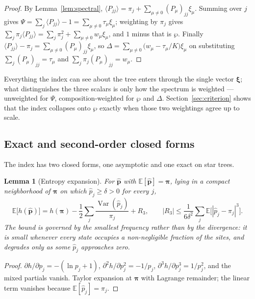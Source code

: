 \documentclass[preprint,12pt,authoryear]{elsarticle}
\newcommand{\bpi}{\boldsymbol{\pi}}
\newcommand{\bxi}{\boldsymbol{\xi}}
\newcommand{\E}{\mathbb{E}}
\newcommand{\Var}{\operatorname{Var}}
\newtheorem{lemma}[theorem]{Lemma}
\theoremstyle{definition}
\theoremstyle{remark}
\begin{document}
\begin{proof}
By Lemma~\ref{lem:spectral},
$\langle P_{jj}\rangle=\pi_j+\sum_{\mu\ne0}(P_\mu)_{jj}\xi_\mu$. Summing over
$j$ gives $\Psi=\sum_j\langle P_{jj}\rangle-1=\sum_{\mu\ne0}\tau_\mu\xi_\mu$;
weighting by $\pi_j$ gives
$\sum_j\pi_j\langle P_{jj}\rangle=\sum_j\pi_j^2+\sum_{\mu\ne0}w_\mu\xi_\mu$,
and $1$ minus that is $\wp$. Finally
$\langle P_{jj}\rangle-\pi_j=\sum_{\mu\ne0}(P_\mu)_{jj}\xi_\mu$, so
$\Delta=\sum_{\mu\ne0}\bigl(w_\mu-\tau_\mu/K\bigr)\xi_\mu$ on substituting
$\sum_j(P_\mu)_{jj}=\tau_\mu$ and $\sum_j\pi_j(P_\mu)_{jj}=w_\mu$.
\end{proof}

Everything the index can see about the tree enters through the single vector
$\bxi$; what distinguishes the three scalars is only how the spectrum is
weighted --- unweighted for $\Psi$, composition-weighted for $\wp$ and
$\Delta$. Section~\ref{sec:criterion} shows that the index collapses onto
$\wp$ exactly when those two weightings agree up to scale.

\subsection{Exact and second-order closed forms}

The index has two closed forms, one asymptotic and one exact on star trees.

\begin{lemma}[Entropy expansion]
\label{lem:entropy}
For $\hat{\mathbf p}$ with $\E[\hat{\mathbf p}]=\bpi$, lying in a compact
neighborhood of $\bpi$ on which $\hat p_j\ge\delta>0$ for every $j$,
\begin{equation}
  \E\bigl[h(\hat{\mathbf p})\bigr]
  =h(\bpi)-\frac12\sum_j\frac{\Var(\hat p_j)}{\pi_j}+R_3,
  \qquad
  |R_3|\le\frac{1}{6\delta^2}\sum_j\E\bigl[|\hat p_j-\pi_j|^3\bigr].
\end{equation}
The bound is governed by the smallest frequency rather than by the
divergence: it is small whenever every state occupies a non-negligible
fraction of the sites, and degrades only as some $\hat p_j$ approaches zero.
\end{lemma}

\begin{proof}
$\partial h/\partial p_j=-(\ln p_j+1)$, $\partial^2h/\partial p_j^2=-1/p_j$,
$\partial^3h/\partial p_j^3=1/p_j^2$, and the mixed partials vanish. Taylor
expansion at $\bpi$ with Lagrange remainder; the linear term vanishes because
$\E[\hat p_j]=\pi_j$.
\end{proof}
\end{document}
